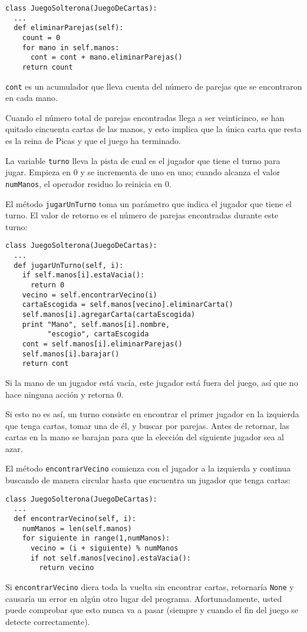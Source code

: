 \beforeverb
\begin{verbatim}
class JuegoSolterona(JuegoDeCartas):
  ...
  def eliminarParejas(self):
    count = 0
    for mano in self.manos:
      cont = cont + mano.eliminarParejas()
    return count
\end{verbatim}
\afterverb
%


\texttt{cont} es un acumulador que lleva cuenta del número
de parejas que se encontraron en cada mano.


Cuando el número total de parejas encontradas llega a ser 
veinticinco, se han quitado cincuenta cartas de las manos, y esto
implica que la única carta que resta es la reina de Picas
y que el juego ha terminado.

La variable \texttt{turno} lleva la pista de cual es el jugador
que tiene el turno para jugar. Empieza en 0 y se incrementa
de uno en uno; cuando alcanza el valor \texttt{numManos}, el 
operador residuo lo reinicia en 0.

El método  \texttt{jugarUnTurno} toma un parámetro que indica 
el jugador que tiene el turno. El valor de retorno es el 
número de parejas encontradas durante este turno:


\beforeverb
\begin{verbatim}
class JuegoSolterona(JuegoDeCartas):
  ...
  def jugarUnTurno(self, i):
    if self.manos[i].estaVacia():
      return 0
    vecino = self.encontrarVecino(i)
    cartaEscogida = self.manos[vecino].eliminarCarta()
    self.manos[i].agregarCarta(cartaEscogida)
    print "Mano", self.manos[i].nombre, 
          "escogio", cartaEscogida
    cont = self.manos[i].eliminarParejas()
    self.manos[i].barajar()
    return cont
\end{verbatim}
\afterverb
%
Si la mano de un jugador está vacía, este jugador está fuera del juego, 
así que no hace ninguna acción y retorna 0.

Si esto no es así, un turno consiste en encontrar el primer jugador
en la izquierda que tenga cartas, tomar una de él, y buscar por
parejas. Antes de retornar, las cartas en la mano se barajan para que
la elección del siguiente jugador sea al azar.

El método  \texttt{encontrarVecino} comienza con el jugador a la izquierda
y continua buscando de manera circular hasta que encuentra un jugador
que tenga cartas:

\beforeverb
\begin{verbatim}
class JuegoSolterona(JuegoDeCartas):
  ...
  def encontrarVecino(self, i):
    numManos = len(self.manos)
    for siguiente in range(1,numManos):
      vecino = (i + siguiente) % numManos
      if not self.manos[vecino].estaVacia():
        return vecino
\end{verbatim}
\afterverb
%
Si  \texttt{encontrarVecino} diera toda la vuelta sin encontrar cartas,
retornaría  \texttt{None} y causaría un error en algún otro lugar del programa.
Afortunadamente, usted puede comprobar que esto nunca va a pasar (siempre y 
cuando el fin del juego se detecte correctamente).


